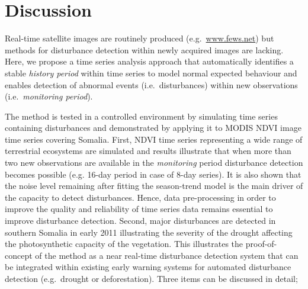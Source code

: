 \documentclass[authoryear,preprint,review,10pt]{elsarticle}
\begin{document}
\section{Discussion} \label{sec:Disc}

Real-time satellite images are routinely produced (e.g.\ \url{www.fews.net}) but methods for disturbance detection within newly acquired images are lacking.
Here, we propose a time series analysis approach that automatically identifies a stable \emph{history period} within time series to model normal expected
behaviour and enables detection of abnormal events (i.e.\ disturbances) within new observations (i.e.\ \emph{monitoring period}).

The method is tested in a controlled environment by simulating time series containing disturbances and demonstrated by applying it to MODIS NDVI image time series covering Somalia. First, NDVI time series representing a wide range of terrestrial ecosystems are simulated and results illustrate that when more than two new observations are available in the \emph{monitoring} period disturbance detection becomes possible (e.g. 16-day period in case of 8-day series). It is also shown that the noise level remaining after fitting the season-trend model is the main driver of the capacity to detect disturbances. Hence, data pre-processing in order to improve the quality and reliability of time series data remains essential to improve disturbance detection.
Second, major disturbances are detected in southern Somalia in early 2011 illustrating the severity of the drought affecting the photosynthetic capacity of the vegetation. This illustrates the proof-of-concept of the method as a near real-time disturbance detection system that can be integrated within existing early warning systems for automated disturbance detection (e.g.\ drought or deforestation). Three items can be discussed in detail;
\end{document}
